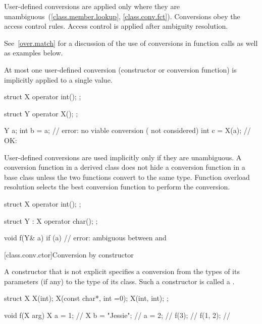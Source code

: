 \pnum
User-defined conversions are applied only where they are unambiguous~(\ref{class.member.lookup}, \ref{class.conv.fct}).
Conversions obey the access control rules.
Access control is applied after ambiguity resolution.

\pnum
\begin{note}
See~\ref{over.match} for a discussion of the use of conversions in function calls
as well as examples below.
\end{note}

\pnum
{}%
At most one user-defined conversion (constructor or conversion function)
is implicitly applied to a single value.
\begin{example}
\begin{codeblock}
struct X {
  operator int();
};

struct Y {
  operator X();
};

Y a;
int b = a;          // error: no viable conversion ( not considered)
int c = X(a);       // OK: 
\end{codeblock}
\end{example}

\pnum
User-defined conversions are used implicitly only if they are unambiguous.
%
A conversion function in a derived class does not hide a conversion function
in a base class unless the two functions convert to the same type.
Function overload resolution selects the best
conversion function to perform the conversion.
\begin{example}
\begin{codeblock}
struct X {
  operator int();
};

struct Y : X {
    operator char();
};

void f(Y& a) {
  if (a) {          // error: ambiguous between  and 
  }
}
\end{codeblock}
\end{example}

[class.conv.ctor]{Conversion by constructor}%
%

\pnum
A constructor that is not explicit
specifies a conversion from
the types of its parameters (if any)
to the type of its class.
Such a constructor is called a
.
\begin{example}
%
\begin{codeblock}
struct X {
    X(int);
    X(const char*, int =0);
    X(int, int);
};

void f(X arg) {
  X a = 1;          // 
  X b = "Jessie";   // 
  a = 2;            // 
  f(3);             // 
  f({1, 2});        // 
}
\end{codeblock}
\end{example}

